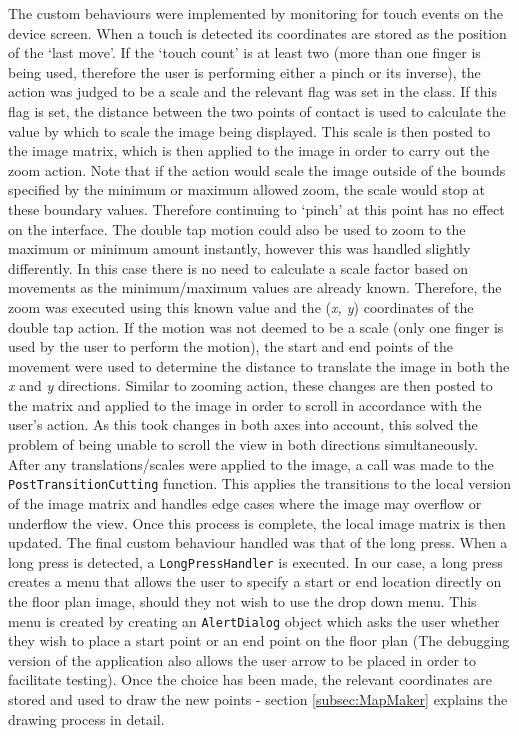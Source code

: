 \documentclass[main.tex]{subfiles}
\begin{document}
                The custom behaviours were implemented by monitoring for touch events on the device
                screen. When a touch is detected its coordinates are stored as the position of the `last move'.
                If the `touch count' is at least two (more than one finger is being used, therefore the user is performing either
                a pinch or its inverse), the action was judged to be a scale and the relevant flag was set in the class. If this flag is set, the distance between the two points of contact
                is used to calculate the value by which to scale the image being displayed. This scale is then posted to the image matrix, which is then applied to the image in
                order to carry out the zoom action. Note that if the action would scale the image outside of the bounds specified by the minimum or maximum allowed zoom,
                the scale would stop at these boundary values. Therefore continuing to `pinch' at this point has no effect on the interface. The double tap motion could also be
                used to zoom to the maximum or minimum amount instantly, however this was handled slightly differently. In this case there is no need to calculate a scale
                factor based on movements as the minimum/maximum values are already known. Therefore, the zoom was executed using this known value and the
                (\textit{x, y}) coordinates of the double tap action.
                If the motion was not deemed to be a scale (only one finger is used by the user to perform the motion), the start and end points
                of the movement were used to determine the distance to translate the image in both the \textit{x} and \textit{y} directions. Similar to zooming action, these changes are
                then posted to the matrix and applied to the image in order to scroll in accordance with the user's action. As this took changes in both axes into account, this
                solved the problem of being unable to scroll the view in both directions simultaneously. After any translations/scales were applied to the image, a call was made to
                the \texttt{PostTransitionCutting} function. This applies the transitions to the local version of the image matrix and handles edge cases where the image may overflow
                or underflow the view. Once this process is complete, the local image matrix is then updated. The final custom behaviour handled was that of the long press. When a 
                long press is detected, a \texttt{LongPressHandler} is executed. In our case, a long press creates a menu that allows the user to specify a start or end location
                directly on the floor plan image, should they not wish to use the drop down menu. This menu is created by creating an \texttt{AlertDialog} object which asks the
                user whether they wish to place a start point or an end point on the floor plan (The debugging version of the application also allows the user arrow to be placed
                in order to facilitate testing). Once the choice has been made, the relevant coordinates are stored and used to draw the new points - section \ref{subsec:MapMaker}
                explains the drawing process in detail.
\end{document}
